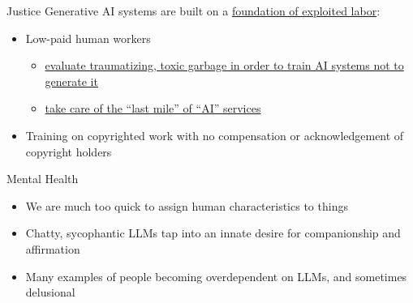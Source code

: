 \documentclass[hyperref={colorlinks},xcolor={usenames,dvipsnames,svgnames,table},12pt]{beamer}
\begin{document}
\begin{frame}{Justice}
Generative AI systems are built on a \href{https://thenib.com/our-labor-built-ai/}{foundation of exploited labor}:
  \begin{itemize}
  \item Low-paid human workers
    \begin{itemize}
    \item \href{https://time.com/6247678/openai-chatgpt-kenya-workers/}{evaluate traumatizing, toxic garbage in order to train AI
      systems not to generate it}
    \item \href{https://www.noemamag.com/the-exploited-labor-behind-artificial-intelligence/}{take care of the ``last mile'' of ``AI'' services}
    \end{itemize}
  \item Training on copyrighted work with no compensation or
    acknowledgement of copyright holders
  \end{itemize}
\end{frame}

\begin{frame}{Mental Health}
  \begin{itemize}
  \item We are much too quick to assign human characteristics to things
  \item Chatty, sycophantic LLMs tap into an innate desire for companionship
    and affirmation
  \item Many examples of people becoming overdependent on LLMs, and
    sometimes delusional
  \end{itemize}
\end{frame}
\end{document}

